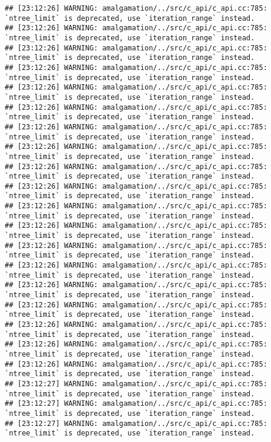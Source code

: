 \documentclass[
]{article}
\begin{document}
\begin{verbatim}
## [23:12:26] WARNING: amalgamation/../src/c_api/c_api.cc:785: `ntree_limit` is deprecated, use `iteration_range` instead.
## [23:12:26] WARNING: amalgamation/../src/c_api/c_api.cc:785: `ntree_limit` is deprecated, use `iteration_range` instead.
## [23:12:26] WARNING: amalgamation/../src/c_api/c_api.cc:785: `ntree_limit` is deprecated, use `iteration_range` instead.
## [23:12:26] WARNING: amalgamation/../src/c_api/c_api.cc:785: `ntree_limit` is deprecated, use `iteration_range` instead.
## [23:12:26] WARNING: amalgamation/../src/c_api/c_api.cc:785: `ntree_limit` is deprecated, use `iteration_range` instead.
## [23:12:26] WARNING: amalgamation/../src/c_api/c_api.cc:785: `ntree_limit` is deprecated, use `iteration_range` instead.
## [23:12:26] WARNING: amalgamation/../src/c_api/c_api.cc:785: `ntree_limit` is deprecated, use `iteration_range` instead.
## [23:12:26] WARNING: amalgamation/../src/c_api/c_api.cc:785: `ntree_limit` is deprecated, use `iteration_range` instead.
## [23:12:26] WARNING: amalgamation/../src/c_api/c_api.cc:785: `ntree_limit` is deprecated, use `iteration_range` instead.
## [23:12:26] WARNING: amalgamation/../src/c_api/c_api.cc:785: `ntree_limit` is deprecated, use `iteration_range` instead.
## [23:12:26] WARNING: amalgamation/../src/c_api/c_api.cc:785: `ntree_limit` is deprecated, use `iteration_range` instead.
## [23:12:26] WARNING: amalgamation/../src/c_api/c_api.cc:785: `ntree_limit` is deprecated, use `iteration_range` instead.
## [23:12:26] WARNING: amalgamation/../src/c_api/c_api.cc:785: `ntree_limit` is deprecated, use `iteration_range` instead.
## [23:12:26] WARNING: amalgamation/../src/c_api/c_api.cc:785: `ntree_limit` is deprecated, use `iteration_range` instead.
## [23:12:26] WARNING: amalgamation/../src/c_api/c_api.cc:785: `ntree_limit` is deprecated, use `iteration_range` instead.
## [23:12:26] WARNING: amalgamation/../src/c_api/c_api.cc:785: `ntree_limit` is deprecated, use `iteration_range` instead.
## [23:12:26] WARNING: amalgamation/../src/c_api/c_api.cc:785: `ntree_limit` is deprecated, use `iteration_range` instead.
## [23:12:26] WARNING: amalgamation/../src/c_api/c_api.cc:785: `ntree_limit` is deprecated, use `iteration_range` instead.
## [23:12:26] WARNING: amalgamation/../src/c_api/c_api.cc:785: `ntree_limit` is deprecated, use `iteration_range` instead.
## [23:12:27] WARNING: amalgamation/../src/c_api/c_api.cc:785: `ntree_limit` is deprecated, use `iteration_range` instead.
## [23:12:27] WARNING: amalgamation/../src/c_api/c_api.cc:785: `ntree_limit` is deprecated, use `iteration_range` instead.
## [23:12:27] WARNING: amalgamation/../src/c_api/c_api.cc:785: `ntree_limit` is deprecated, use `iteration_range` instead.

\end{verbatim}
\end{document}
